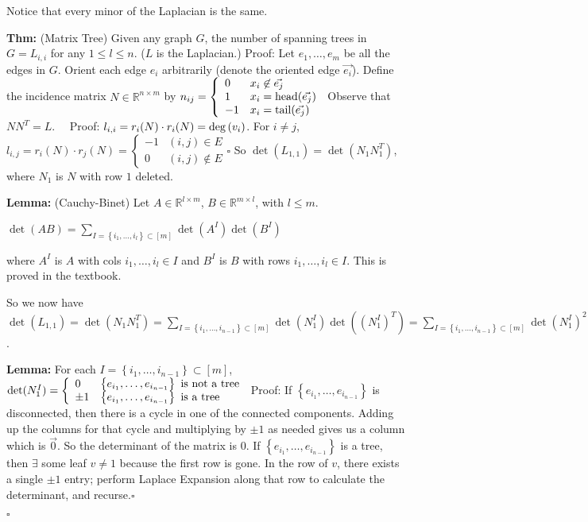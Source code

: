\documentclass[10pt,letterpaper]{article}
\newcommand{\n}{\hfill\break}
\newcommand{\lemma}[1]{\par\noindent\settowidth{\hangindent}{\textbf{Lemma: }}\textbf{Lemma: }#1\n}
\newcommand{\thm}[1]{\par\noindent\settowidth{\hangindent}{\textbf{Thm: }}\textbf{Thm: }#1\n}
\newcommand{\proven}{\;$\square$\n}
\newcommand{\ptxt}[1]{\textrm{\textnormal{#1}}}
\newcommand{\inlineeq}[1]{\n\centerline{$\displaystyle #1$}}
\newcommand{\set}[1]{\left\{#1\right\}}
\newcommand{\reals}{\mathbb{R}}
\newcommand{\R}{\reals}
\renewcommand{\deg}[1]{\ptxt{deg}\left(#1\right)}
\newcommand{\tpose}{^{T}}
\begin{document}
\par\noindent Notice that every minor of the Laplacian is the same.\n

\thm{(Matrix Tree) Given any graph $G$, the number of spanning trees in $G=L_{i,i}$ for any $1\le{}l\le{}n$. ($L$ is the Laplacian.)\n
Proof: Let $e_{1},\ldots,e_{m}$ be all the edges in $G$. Orient each edge $e_{i}$ arbitrarily (denote the oriented edge $\vec{e_{i}}$).\n
Define the incidence matrix $N\in\R^{n\times{}m}$ by $\displaystyle{}n_{ij}=\left\{\begin{array}{ll}0 & x_{i}\not\in\vec{e_{j}}\\ 1 & x_{i}=\ptxt{head}(\vec{e_{j}})\\ -1 & x_{i}=\ptxt{tail}(\vec{e_{j}})\end{array}\right.$\n
\n
Observe that $NN\tpose=L$.\n
${}\quad$Proof: $l_{i,i}=r_{i}(N)\cdot{}r_{i}(N)=\deg{v_{i}}$. For $i\ne{}j$, $l_{i,j}=r_{i}(N)\cdot{}r_{j}(N)=\left\{\begin{array}{ll}-1 & (i,j)\in{}E\\ 0 & (i,j)\not\in{}E\end{array}\right.\square$\n
\n
So $\det(L_{1,1})=\det(N_{1}N_{1}\tpose)$, where $N_{1}$ is $N$ with row $1$ deleted.}

\lemma{(Cauchy-Binet) Let $A\in\R^{l\times{}m}$, $B\in\R^{m\times{}l}$, with $l\le{}m$.\n
\inlineeq{\det(AB)=\sum_{I=\set{i_{1},\ldots,i_{l}}\subset{}[m]}\det(A^{I})\det(B^{I})}\n
where $A^{I}$ is $A$ with cols $i_{1},\ldots,i_{l}\in{}I$ and $B^{I}$ is $B$ with rows $i_{1},\ldots,i_{l}\in{}I$.\n
This is proved in the textbook.\n}

\par\noindent{}So we now have $\displaystyle\det(L_{1,1})=\det(N_{1}N_{1}\tpose)=\sum_{I=\set{i_{1},\ldots,i_{n-1}}\subset{}[m]}\det(N_{1}^{I})\det((N_{1}^{I})\tpose)=\sum_{I=\set{i_{1},\ldots,i_{n-1}}\subset{}[m]}\det(N_{1}^{I})^{2}$.\n

\lemma{For each $I=\set{i_{1},\ldots,i_{n-1}}\subset{}[m]$, $\det(N_{1}^{I})=\left\{\begin{array}{ll}0 & \set{e_{i_{1}},\ldots,e_{i_{n-1}}}\ptxt{ is not a tree}\\ \pm{}1 & \set{e_{i_{1}},\ldots,e_{i_{n-1}}}\ptxt{ is a tree}\end{array}\right.$\n
Proof: If $\set{e_{i_{1}},\ldots,e_{i_{n-1}}}$ is disconnected, then there is a cycle in one of the connected components. Adding up the columns for that cycle and multiplying by $\pm{}1$ as needed gives us a column which is $\vec{0}$. So the determinant of the matrix is $0$.\n
If $\set{e_{i_{1}},\ldots,e_{i_{n-1}}}$ is a tree, then $\exists$ some leaf $v\ne{}1$ because the first row is gone. In the row of $v$, there exists a single $\pm{}1$ entry; perform Laplace Expansion along that row to calculate the determinant, and recurse.\proven}

\proven
\end{document}

